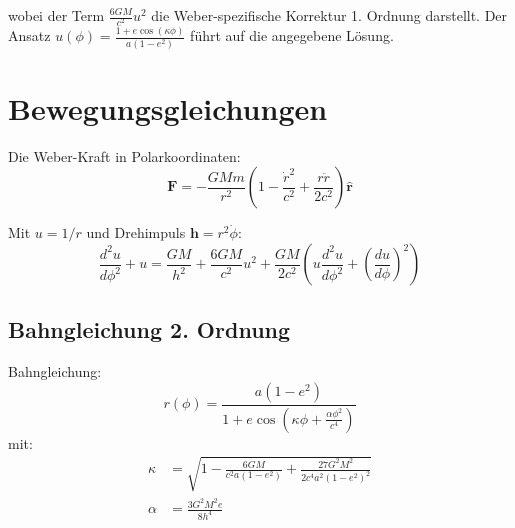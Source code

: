 wobei der Term \(\frac{6GM}{c^2} u^2\) die Weber-spezifische Korrektur 1. Ordnung darstellt. Der Ansatz \(u(\phi) = \frac{1 + e \cos(\kappa\phi)}{a(1 - e^2)}\) führt auf die angegebene Lösung.

\section{Bewegungsgleichungen}
Die Weber-Kraft in Polarkoordinaten:
\begin{equation}
\mathbf{F} = -\frac{GMm}{r^2}\left(1 - \frac{\dot{r}^2}{c^2} + \frac{r\ddot{r}}{2c^2}\right)\mathbf{\hat{r}}
\end{equation}

Mit $u=1/r$ und Drehimpuls $\mathbf{h}=r^2\dot{\phi}$:
\begin{equation}
\frac{d^2u}{d\phi^2} + u = \frac{GM}{h^2} + \frac{6GM}{c^2}u^2 + \frac{GM}{2c^2}\left(u\frac{d^2u}{d\phi^2} + \left(\frac{du}{d\phi}\right)^2\right)
\end{equation}

\subsection{Bahngleichung 2. Ordnung}
Bahngleichung:
\begin{equation}
\boxed
{
    r(\phi) = \frac{a(1-e^2)}{1 + e\cos\left(\kappa\phi + \frac{\alpha\phi^2}{c^4}\right)}
}
\end{equation}
mit:
\begin{align}
\kappa &= \sqrt{1 - \frac{6GM}{c^2a(1-e^2)} + \frac{27G^2M^2}{2c^4a^2(1-e^2)^2}}\\
\alpha &= \frac{3G^2M^2e}{8h^4}
\end{align}
